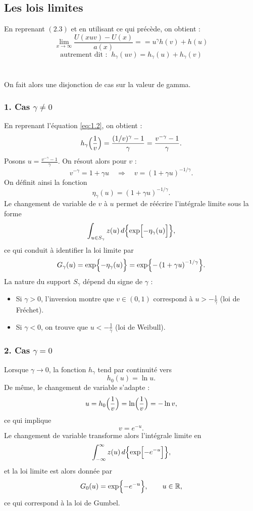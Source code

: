 \documentclass{article}
\begin{document}
\subsection{Les lois limites}
En reprenant $(2.3)$ et en utilisant ce qui précède, on obtient :
\[
\lim_{x\to \infty} \frac{U(xuv) - U(x)}{a(x)} = = u^{\gamma} h(v) + h(u)
\]
\[
\text{autrement dit :} \; \; h_{\gamma}(uv)= h_{\gamma}(u) + h_{\gamma}(v)
\]
\\
\\
On fait alors une disjonction de cas sur la valeur de gamma.
\\
\subsubsection{1. Cas \(\gamma\neq0\)}

En reprenant l'équation \eqref{eq:1.2}, on obtient :
\[
h_\gamma\Bigl(\frac{1}{v}\Bigr)=\frac{(1/v)^\gamma-1}{\gamma}=\frac{v^{-\gamma}-1}{\gamma}.
\]
Posons \(u=\frac{v^{-\gamma}-1}{\gamma}\). On résout alors pour \(v\) :
\[
v^{-\gamma}=1+\gamma u\quad\Longrightarrow\quad v=(1+\gamma u)^{-1/\gamma}.
\]
On définit ainsi la fonction
\[
\eta_\gamma(u)=(1+\gamma u)^{-1/\gamma}.
\]
Le changement de variable de \(v\) à \(u\) permet de réécrire l'intégrale limite sous la forme
\[
\int_{u\in S_\gamma} z(u)\,d\Bigl\{\exp\Bigl[-\eta_\gamma(u)\Bigr]\Bigr\},
\]
ce qui conduit à identifier la loi limite par
\[
G_\gamma(u)=\exp\Bigl\{-\eta_\gamma(u)\Bigr\}=\exp\Bigl\{-\left(1+\gamma u\right)^{-1/\gamma}\Bigr\}.
\]
La nature du support \(S_\gamma\) dépend du signe de \(\gamma\) :
\begin{itemize}
    \item Si \(\gamma>0\), l'inversion montre que \(v\in(0,1)\) correspond à \(u>-\frac{1}{\gamma}\) (loi de Fréchet).
    \item Si \(\gamma<0\), on trouve que \(u<-\frac{1}{\gamma}\) (loi de Weibull).
\end{itemize}
\subsubsection{2. Cas \(\gamma=0\)}
Lorsque \(\gamma\to0\), la fonction \(h_\gamma\) tend par continuité vers
\[
h_0(u)=\ln u.
\]
De même, le changement de variable s'adapte : 
\[
u=h_0\Bigl(\frac{1}{v}\Bigr)=\ln\Bigl(\frac{1}{v}\Bigr)=-\ln v,
\]
ce qui implique
\[
v=e^{-u}.
\]
Le changement de variable transforme alors l'intégrale limite en
\[
\int_{-\infty}^{\infty} z(u)\,d\Bigl\{\exp\Bigl[-e^{-u}\Bigr]\Bigr\},
\]
et la loi limite est alors donnée par
\[
G_0(u)=\exp\Bigl\{-e^{-u}\Bigr\},\qquad u\in\mathbb{R},
\]
ce qui correspond à la loi de Gumbel.
\\
\end{document}
